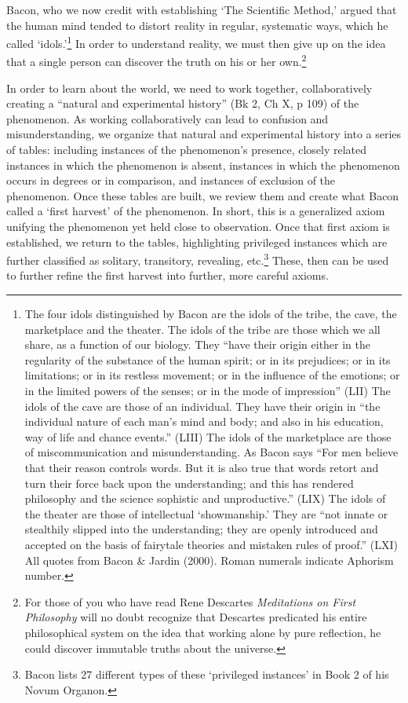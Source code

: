 Bacon, who we now credit with establishing `The Scientific Method,' argued that the human mind tended to distort reality in regular, systematic ways, which he called `idols.'\footnote{The four idols distinguished by Bacon are the idols of the tribe, the cave, the marketplace and the theater. The idols of the tribe are those which we all share, as a function of our biology. They “have their origin either in the regularity of the substance of the human spirit; or in its prejudices; or in its limitations; or in its restless movement; or in the influence of the emotions; or in the limited powers of the senses; or in the mode of impression” (LII)
The idols of the cave are those of an individual. They have their origin in “the individual nature of each man's mind and body; and also in his education, way of life and chance events.” (LIII)
The idols of the marketplace are those of miscommunication and misunderstanding. As Bacon says “For men believe that their reason controls words. But it is also true that words retort and turn their force back upon the understanding; and this has rendered philosophy and the science sophistic and unproductive.” (LIX)
The idols of the theater are those of intellectual `showmanship.' They are “not innate or stealthily slipped into the understanding; they are openly introduced and accepted on the basis of fairytale theories and mistaken rules of proof.” (LXI)
All quotes from Bacon \& Jardin (2000). Roman numerals indicate Aphorism number.} In order to understand reality, we must then give up on the idea that a single person can discover the truth on his or her own.\footnote{For those of you who have read Rene Descartes \emph{Meditations on First Philosophy} will no doubt recognize that Descartes predicated his entire philosophical system on the idea that working alone by pure reflection, he could discover immutable truths about the universe.}

In order to learn about the world, we need to work together, collaboratively creating a “natural and experimental history” (Bk 2, Ch X, p 109) of the phenomenon. As working collaboratively can lead to confusion and misunderstanding, we organize that natural and experimental history into a series of tables: including instances of the phenomenon's presence, closely related instances in which the phenomenon is absent, instances in which the phenomenon occurs in degrees or in comparison, and instances of exclusion of the phenomenon. Once these tables are built, we review them and create what Bacon called a `first harvest' of the phenomenon. In short, this is a generalized axiom unifying the phenomenon yet held close to observation. Once that first axiom is established, we return to the tables, highlighting privileged instances which are further classified as solitary, transitory, revealing, etc.\footnote{Bacon lists 27 different types of these `privileged instances' in Book 2 of his Novum Organon.} These, then can be used to further refine the first harvest into further, more careful axioms.

